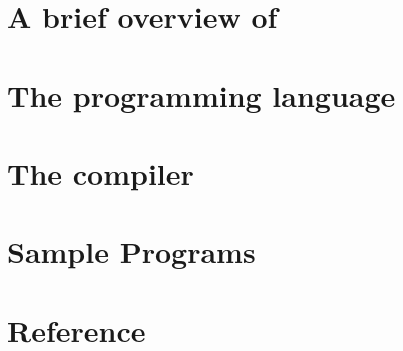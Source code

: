 \documentclass[twoside]{axiom}
\begin{document}


\cleardoublepage



\cleardoublepage
%
\summarycontents
\cleardoublepage
\tableofcontents
\listoffigures
\cleardoublepage

\part{A brief overview of \asharp{}}




\part{The \asharp{} programming language}


\part{The \asharp{} compiler}



%


%

\part{Sample Programs}
%
%


\part{Reference}

%
%



%


\NoHyper

\end{document}
